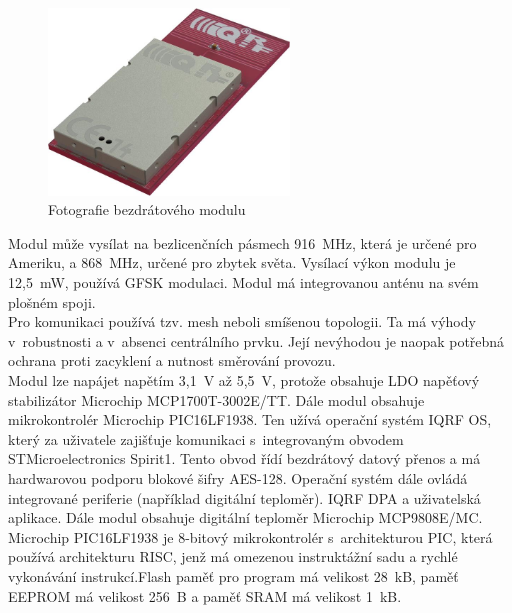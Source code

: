 \documentclass[12pt,a4paper,oneside]{article}
\begin{document}
\begin{figure}[H]
\centering
\label{fig:iqrf/fotka}
\includegraphics[width = 64mm]{img/iqrf/dctr-72dat.png}
\caption{Fotografie bezdrátového modulu}
\end{figure}

Modul může vysílat na bezlicenčních pásmech 916~MHz, která je určené pro Ameriku, a 868~MHz, určené pro zbytek světa. Vysílací výkon modulu je 12,5~mW, používá GFSK modulaci. Modul má integrovanou anténu na svém plošném spoji. \\

Pro komunikaci používá tzv. mesh neboli smíšenou topologii. Ta má výhody v~robustnosti a v~absenci centrálního prvku. Její nevýhodou je naopak potřebná ochrana proti zacyklení a nutnost směrování provozu. \\

Modul lze napájet napětím 3,1~V až 5,5~V, protože obsahuje LDO napěťový stabilizátor Microchip MCP1700T-3002E/TT. Dále modul obsahuje mikrokontrolér Microchip PIC16LF1938. Ten užívá operační systém IQRF OS, který za uživatele zajišťuje komunikaci s~integrovaným obvodem STMicroelectronics Spirit1. Tento obvod řídí bezdrátový datový přenos a má hardwarovou podporu blokové šifry AES-128. Operační systém dále ovládá integrované periferie (například digitální teploměr). IQRF DPA a uživatelská aplikace. Dále modul obsahuje digitální teploměr Microchip MCP9808E/MC. \\

Microchip PIC16LF1938 je 8-bitový mikrokontrolér s~architekturou PIC, která používá architekturu RISC, jenž má omezenou instruktážní sadu a rychlé vykonávání instrukcí.Flash paměť pro program má velikost 28~kB, paměť EEPROM má velikost 256~B a paměť SRAM má velikost 1~kB.
\end{document}
